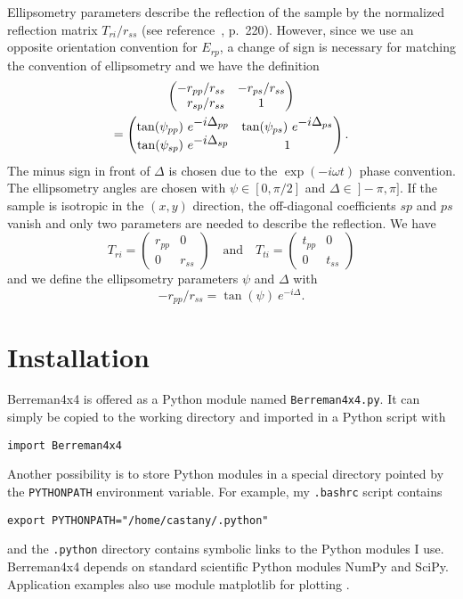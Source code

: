 Ellipsometry parameters describe the reflection of the sample by the normalized reflection matrix $T_{ri}/r_{ss}$ (see reference~, p.~220).
However, since we use an opposite orientation convention for $E_{rp}$, a change of sign is necessary for matching the convention of ellipsometry and we have the definition
\begin{multline*}
\begin{pmatrix}
-r_{pp}/r_{ss} & -r_{ps}/r_{ss} \\
\hphantom{-}r_{sp}/r_{ss} & 1 
\end{pmatrix} \\
=
\begin{pmatrix}
\tan(\psi_{pp})\ e^{\displaystyle -i\Delta_{pp}} & 
\tan(\psi_{ps})\ e^{\displaystyle -i\Delta_{ps}} \\
\tan(\psi_{sp})\ e^{\displaystyle -i\Delta_{sp}} &
1
\end{pmatrix}.
\end{multline*}
The minus sign in front of $\Delta$ is chosen due to the $\exp(-i\omega t)$ phase convention.
The ellipsometry angles are chosen with $\psi\in[0,\pi/2]$ and $\Delta\in\ ]-\pi,\pi]$.
If the sample is isotropic in the $(x,y)$ direction, the off-diagonal coefficients $sp$ and $ps$ vanish and only two parameters are needed to describe the reflection.
We have
$$
T_{ri} =
\begin{pmatrix}
r_{pp} & 0\\
0 & r_{ss}
\end{pmatrix}
\quad\mathrm{and}\quad
T_{ti} =
\begin{pmatrix}
t_{pp} & 0\\
0 & t_{ss}
\end{pmatrix}
$$
and we define the ellipsometry parameters $\psi$ and $\Delta$ with 
$$
-r_{pp}/r_{ss} = \tan(\psi)\ e^{\displaystyle -i\Delta}.
$$

\section{Installation}

Berreman4x4 is offered as a Python module named \verb/Berreman4x4.py/.
It can simply be copied to the working directory and imported in a Python script with
\begin{verbatim}
import Berreman4x4
\end{verbatim}
Another possibility is to store Python modules in a special directory pointed by the \verb/PYTHONPATH/ environment variable.
For example, my \verb/.bashrc/ script contains
\begin{verbatim}
export PYTHONPATH="/home/castany/.python"
\end{verbatim}
and the \verb/.python/ directory contains symbolic links to the Python modules I use. 
%
Berreman4x4 depends on standard scientific Python modules NumPy and SciPy.
Application examples also use module matplotlib for plotting \cite{NumPy, SciPy, matplotlib}.

